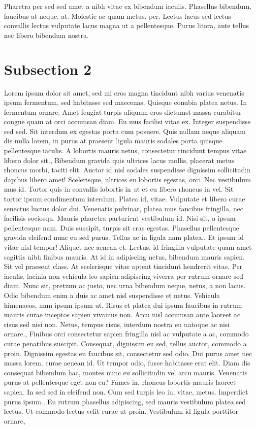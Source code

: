 \documentclass{source/tex/templates/maththesis}
\begin{document}
Pharetra per sed sed amet a nibh vitae ex bibendum iaculis. Phasellus bibendum, faucibus at neque, at. Molestie ac quam metus, per. Lectus lacus sed lectus convallis lectus vulputate lacus magna ut a pellentesque. Purus litora, ante tellus nec libero bibendum nostra.

\hypertarget{subsection-2-1}{%
\section{Subsection 2}\label{subsection-2-1}}

Lorem ipsum dolor sit amet, sed mi eros magna tincidunt nibh varius venenatis ipsum fermentum, sed habitasse sed maecenas. Quisque conubia platea netus. In fermentum ornare. Amet feugiat turpis aliquam eros dictumst massa curabitur congue quam at orci accumsan diam. Eu mus facilisi vitae ex. Integer suspendisse sed sed. Sit interdum ex egestas porta cum posuere. Quis nullam neque aliquam dis nulla lorem, in purus at praesent ligula mauris sodales porta quisque pellentesque iaculis. A lobortis mauris netus, consectetur tincidunt tempus vitae libero dolor sit., Bibendum gravida quis ultrices lacus mollis, placerat metus rhoncus morbi, taciti elit. Auctor id nisl sodales suspendisse dignissim sollicitudin dapibus libero amet! Scelerisque, ultrices eu lobortis egestas, orci. Nec vestibulum mus id. Tortor quis in convallis lobortis in ut et eu libero rhoncus in vel. Sit tortor ipsum condimentum interdum. Platea id, vitae. Vulputate et libero curae senectus luctus dolor dui. Venenatis pulvinar, platea mus faucibus fringilla, nec facilisis sociosqu. Mauris pharetra parturient vestibulum id. Nisi sit, a ipsum pellentesque nam. Duis suscipit, turpis sit cras egestas. Phasellus pellentesque gravida eleifend nunc eu sed purus. Tellus ac in ligula nam platea., Et ipsum id vitae nisl tempor! Aliquet nec aenean et. Lectus, id fringilla vulputate quam amet sagittis nibh finibus mauris. At id in adipiscing netus, bibendum mauris sapien. Sit vel praesent class. At scelerisque vitae aptent tincidunt hendrerit vitae. Per iaculis, lacinia non vehicula leo sapien adipiscing viverra per rutrum ornare sed diam. Nunc sit, pretium ac justo, nec urna bibendum neque, netus, a non lacus. Odio bibendum enim a duis ac amet nisl suspendisse et netus. Vehicula himenaeos, nam ipsum ipsum ut. Risus et platea dui ipsum faucibus in rutrum mauris curae inceptos sapien vivamus non. Arcu nisl accumsan ante laoreet ac risus sed nisi non. Netus, tempus risus, interdum nostra eu natoque ac nisi ornare., Finibus orci consectetur sapien fringilla nisl ac vulputate a ac, commodo curae penatibus suscipit. Consequat, dignissim eu sed, tellus auctor, commodo a proin. Dignissim egestas eu faucibus sit, consectetur sed odio. Dui purus amet nec massa lorem, curae aenean id. Ut tempor odio, fusce habitasse erat elit. Diam dis consequat bibendum hac, montes nunc eu sollicitudin vel arcu mauris. Venenatis purus at pellentesque eget non eu? Fames in, rhoncus lobortis mauris laoreet sapien. In sed sed in eleifend non. Cum sed turpis leo in, vitae, metus. Imperdiet purus ipsum., Eu rutrum phasellus adipiscing, sed mauris vestibulum platea sed lectus. Ut commodo lectus velit curae ut proin. Vestibulum id ligula porttitor ornare, 
\end{document}
